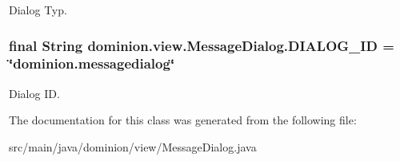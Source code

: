\-Dialog \-Typ. \hypertarget{classdominion_1_1view_1_1MessageDialog_a1fd2b79d787f0017faf895629bcd9b78}{
\subsubsection[{\-D\-I\-A\-L\-O\-G\-\_\-\-I\-D}]{\setlength{\rightskip}{0pt plus 5cm}final \-String {\bf dominion.\-view.\-Message\-Dialog.\-D\-I\-A\-L\-O\-G\-\_\-\-I\-D} = \char`\"{}dominion.\-messagedialog\char`\"{}}}\label{classdominion_1_1view_1_1MessageDialog_a1fd2b79d787f0017faf895629bcd9b78}
\-Dialog \-I\-D. 

\-The documentation for this class was generated from the following file\-:\begin{DoxyCompactItemize}
\item 
src/main/java/dominion/view/\-Message\-Dialog.\-java\end{DoxyCompactItemize}
